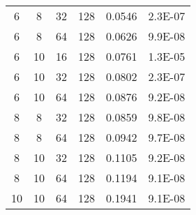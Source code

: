 \begin{table}[]
{\begin{tabular}{cccccc}
\rowcolor[HTML]{77AB59} 
6  & 8  & 32 & 128 & 0.0546 & 2.3E-07 \\
\rowcolor[HTML]{77AB59} 
6  & 8  & 64 & 128 & 0.0626 & 9.9E-08 \\
\rowcolor[HTML]{C9DF8A} 
6  & 10 & 16 & 128 & 0.0761 & 1.3E-05 \\
\rowcolor[HTML]{77AB59} 
6  & 10 & 32 & 128 & 0.0802 & 2.3E-07 \\
\rowcolor[HTML]{77AB59} 
6  & 10 & 64 & 128 & 0.0876 & 9.2E-08 \\
\rowcolor[HTML]{77AB59} 
8  & 8  & 32 & 128 & 0.0859 & 9.8E-08 \\
\rowcolor[HTML]{77AB59} 
8  & 8  & 64 & 128 & 0.0942 & 9.7E-08 \\
\rowcolor[HTML]{77AB59} 
8  & 10 & 32 & 128 & 0.1105 & 9.2E-08 \\
\rowcolor[HTML]{77AB59} 
8  & 10 & 64 & 128 & 0.1194 & 9.1E-08 \\
\rowcolor[HTML]{77AB59} 
10 & 10 & 64 & 128 & 0.1941 & 9.1E-08
\end{tabular}%
}
\end{table}